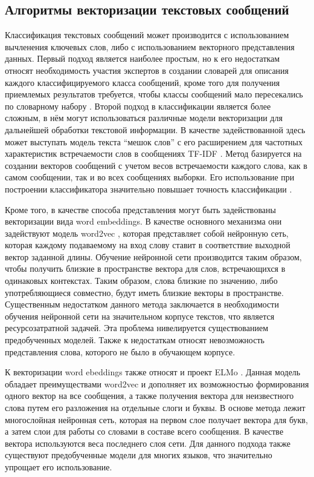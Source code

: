 \subsection{Алгоритмы векторизации текстовых сообщений}

Классификация текстовых сообщений может производится с использованием вычленения ключевых слов, либо с использованием векторного представления данных.
Первый подход является наиболее простым, но к его недостаткам относят необходимость участия экспертов в создании словарей для описания каждого классифицируемого класса сообщений, кроме того для получения приемлемых результатов требуется, чтобы классы сообщений мало пересекались по словарному набору \cite{vectorizations}.
Второй подход в классификации является более сложным, в нём могут использоваться различные модели векторизации для дальнейшей обработки текстовой информации.
В качестве задействованной здесь может выступать модель текста ``мешок слов'' \cite{bagOfWords} с его расширением для частотных характеристик встречаемости слов в сообщениях TF-IDF \cite{tfIdf}.
Метод базируется на создании векторов сообщений с учетом весов встречаемости каждого слова, как в самом сообщении, так и во всех сообщениях выборки.
Его использование при построении классификатора значительно повышает точность классификации \cite{vectorizations}.

Кроме того, в качестве способа представления могут быть задействованы векторизации вида word embeddings.
В качестве основного механизма они задействуют модель word2vec \cite{word2vec}, которая представляет собой нейронную сеть, которая каждому подаваемому на вход слову ставит в соответствие выходной вектор заданной длины.
Обучение нейронной сети производится таким образом, чтобы получить близкие в пространстве вектора для слов, встречающихся в одинаковых контекстах.
Таким образом, слова близкие по значению, либо употребляющиеся совместно, будут иметь близкие векторы в пространстве.
Существенным недостатком данного метода заключается в необходимости обучения нейронной сети на значительном корпусе текстов, что является ресурсозатратной задачей.
Эта проблема нивелируется существованием предобученных моделей.
Также к недостаткам относят невозможность представления слова, которого не было в обучающем корпусе. \cite{vectorizations}

К векторизации word ebeddings также относят и проект ELMo \cite{elmo}. Данная модель обладает преимуществами word2vec и дополняет их возможностью формирования одного вектор на все сообщения, а также получения вектора для неизвестного слова путем его разложения на отдельные слоги и буквы.
В основе метода лежит многослойная нейронная сеть, которая на первом слое получает вектора для букв, а затем слои для работы со словами в составе всего сообщения.
В качестве вектора используются веса последнего слоя сети. Для данного подхода также существуют предобученные модели для многих языков, что значительно упрощает его использование. \cite{vectorizations}

